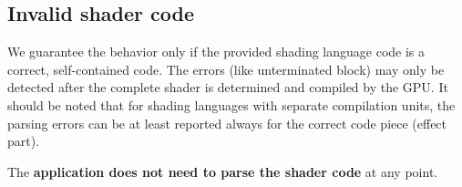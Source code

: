 \documentclass{egpubl}
\begin{document}

\subsection{Invalid shader code}

We guarantee the behavior only if the provided shading language code
is a correct, self-contained code. The errors (like unterminated block)
may only be detected after the complete shader
is determined and compiled by the GPU.
It should be noted that for shading languages with separate compilation units,
the parsing errors can be at least reported always for the correct code piece
(effect part).

The \textbf{application does not need to parse the shader code} at any point.



\end{document}
